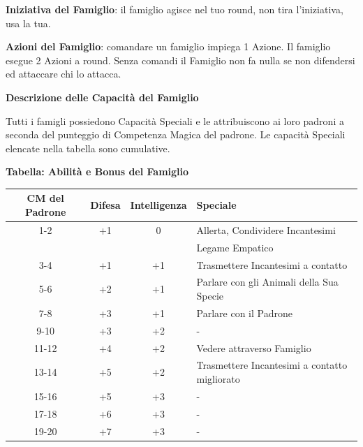 \begin{multicols}{2}
\textbf{Iniziativa del Famiglio}: il famiglio agisce nel tuo round, non tira l'iniziativa, usa la tua.

\textbf{Azioni del Famiglio}: comandare un famiglio impiega 1 Azione. Il famiglio esegue 2 Azioni a round. Senza comandi il Famiglio non fa nulla se non difendersi ed attaccare chi lo attacca.

\textbf{Descrizione delle Capacità del Famiglio}

Tutti i famigli possiedono Capacità Speciali e le attribuiscono ai loro padroni a seconda del punteggio di Competenza Magica del padrone. Le capacità Speciali elencate nella tabella sono cumulative.

\end{multicols}

\textbf{Tabella: Abilità e Bonus del Famiglio}

\medskip
{

\noindent\begin{tabularx}{\linewidth}{cccX}
	\toprule
\rowcolor{gray!20}\textbf{CM del Padrone} & \textbf{Difesa} & \textbf{Intelligenza} & \textbf{Speciale}\\
\toprule
1-2 & +1 & 0 & Allerta, Condividere Incantesimi\\
\rowcolor{gray!20}& && Legame Empatico\\
3-4 & +1 & +1 & Trasmettere Incantesimi a contatto\\
\rowcolor{gray!20}5-6 & +2 & +1 & Parlare con gli Animali della Sua Specie\\
7-8 & +3 & +1 & Parlare con il Padrone\\
\rowcolor{gray!20}9-10 & +3 & +2 & -\\
11-12 & +4 & +2 & Vedere attraverso Famiglio\\
\rowcolor{gray!20}13-14 & +5 & +2 & Trasmettere Incantesimi a contatto migliorato\\
15-16 & +5 & +3 & -\\
\rowcolor{gray!20}17-18 & +6 & +3 & -\\
19-20 & +7 & +3 & -
\end{tabularx}}

